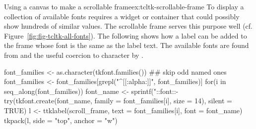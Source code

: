 \begin{example}{Using a canvas to make a scrollable frame}{ex:tcltk-scrollable-frame}
To display a collection of available fonts requires a widget or
container that could possibly show hundreds of similar values. The
scrollable frame serves this purpose well
(cf. Figure~\ref{fig:fig-tcltk-all-fonts}).  The following shows how a
label can be added to the frame whose font is the same as the label
text. The available fonts are found from 
and the useful coercion to character by .
\begin{Schunk}
\begin{Sinput}
 font_families <- as.character(tkfont.families())
 ## skip odd named ones
 font_families <- font_families[grepl("^[[:alpha:]]",
                                      font_families)] 
 for(i in seq_along(font_families)) {
   font_name <- sprintf("::font::-%
   try(tkfont.create(font_name, family = font_families[i],
                     size = 14), 
       silent = TRUE)
   l <- ttklabel(scroll_frame, text = font_families[i],
                 font = font_name)
   tkpack(l, side = "top", anchor = "w")
 }
\end{Sinput}
\end{Schunk}

\end{example}


